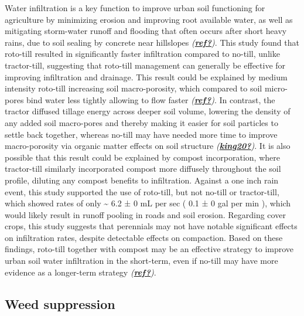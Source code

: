 \documentclass[
]{article}
\begin{document}
Water infiltration is a key function to improve urban soil functioning for agriculture by minimizing erosion and improving root available water, as well as mitigating storm-water runoff and flooding that often occurs after short heavy rains, due to soil sealing by concrete near hillslopes \emph{(\protect\hyperlink{ref-ref}{\textbf{ref?}})}.
This study found that roto-till resulted in significantly faster infiltration compared to no-till, unlike tractor-till, suggesting that roto-till management can generally be effective for improving infiltration and drainage.
This result could be explained by medium intensity roto-till increasing soil macro-porosity, which compared to soil micro-pores bind water less tightly allowing to flow faster \emph{(\protect\hyperlink{ref-ref}{\textbf{ref?}})}.
In contrast, the tractor diffused tillage energy across deeper soil volume, lowering the density of any added soil macro-pores and thereby making it easier for soil particles to settle back together, whereas no-till may have needed more time to improve macro-porosity via organic matter effects on soil structure \emph{(\protect\hyperlink{ref-king20}{\textbf{king20?}})}.
It is also possible that this result could be explained by compost incorporation, where tractor-till similarly incorporated compost more diffusely throughout the soil profile, diluting any compost benefits to infiltration.
Against a one inch rain event, this study supported the use of roto-till, but not no-till or tractor-till, which showed rates of only
\textasciitilde{} 6.2 ±
0 mL per sec
(
0.1 ±
0 gal per min
),
which would likely result in runoff pooling in roads and soil erosion.
Regarding cover crops, this study suggests that perennials may not have notable significant effects on infiltration rates, despite detectable effects on compaction.
Based on these findings, roto-till together with compost may be an effective strategy to improve urban soil water infiltration in the short-term, even if no-till may have more evidence as a longer-term strategy \emph{(\protect\hyperlink{ref-ref}{\textbf{ref?}})}.

\hypertarget{weed-suppression}{%
\subsection{Weed suppression}\label{weed-suppression}}
\end{document}
